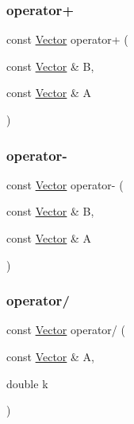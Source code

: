 \hypertarget{class_p_c_a_1_1_vector_a28f83573668a6265c637ee1c77618c84}{}\label{class_p_c_a_1_1_vector_a28f83573668a6265c637ee1c77618c84} 
\subsubsection{\texorpdfstring{operator+}{operator+}}
{\footnotesize\ttfamily const \hyperlink{class_p_c_a_1_1_vector}{Vector} operator+ (\begin{DoxyParamCaption}\item[{const \hyperlink{class_p_c_a_1_1_vector}{Vector} \&}]{B,  }\item[{const \hyperlink{class_p_c_a_1_1_vector}{Vector} \&}]{A }\end{DoxyParamCaption})\hspace{0.3cm}{\ttfamily [friend]}}

\hypertarget{class_p_c_a_1_1_vector_a64185acd75c99c1a3a494a41098fd413}{}\label{class_p_c_a_1_1_vector_a64185acd75c99c1a3a494a41098fd413} 
\subsubsection{\texorpdfstring{operator-\/}{operator-}}
{\footnotesize\ttfamily const \hyperlink{class_p_c_a_1_1_vector}{Vector} operator-\/ (\begin{DoxyParamCaption}\item[{const \hyperlink{class_p_c_a_1_1_vector}{Vector} \&}]{B,  }\item[{const \hyperlink{class_p_c_a_1_1_vector}{Vector} \&}]{A }\end{DoxyParamCaption})\hspace{0.3cm}{\ttfamily [friend]}}

\hypertarget{class_p_c_a_1_1_vector_a47572e42d2d4fd6fbe0f891d61809e3b}{}\label{class_p_c_a_1_1_vector_a47572e42d2d4fd6fbe0f891d61809e3b} 
\subsubsection{\texorpdfstring{operator/}{operator/}}
{\footnotesize\ttfamily const \hyperlink{class_p_c_a_1_1_vector}{Vector} operator/ (\begin{DoxyParamCaption}\item[{const \hyperlink{class_p_c_a_1_1_vector}{Vector} \&}]{A,  }\item[{double}]{k }\end{DoxyParamCaption})\hspace{0.3cm}{\ttfamily [friend]}}



